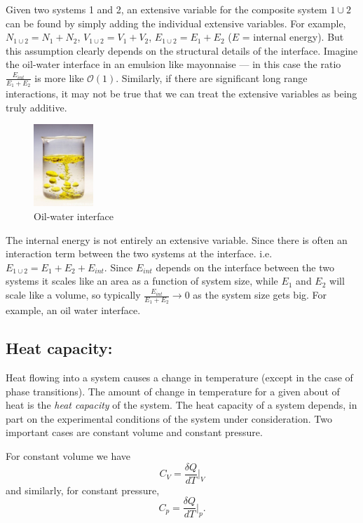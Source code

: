 Given two systems 1 and 2, an extensive variable for the composite system $1\cup2$ can be found by simply adding the individual extensive variables. For example, $N_{1\cup2} = N_1 + N_2$, $V_{1\cup2} = V_1 + V_2$, $E_{1\cup2} = E_1 + E_2$ ($E$ = internal energy). But this assumption clearly depends on the structural details of the interface. Imagine the oil-water interface in an emulsion like mayonnaise --- in this case the ratio  $\frac{E_{int}}{E_1+E_2}$ is more like $\mathcal{O}(1)$.
Similarly, if there are significant long range interactions, it may not be true that we can treat the extensive variables as being truly additive.
\begin{figure}[H]
	\begin{center}
		\includegraphics[width=0.2\textwidth]{oilwater}
	\end{center}
	\caption{Oil-water interface}
\end{figure}
The internal energy is not entirely an extensive variable. Since there is often an interaction term between the two systems at the interface. i.e. $E_{1\cup2} = E_1+E_2+E_{int}$. Since $E_{int}$ depends on the interface between the two systems it scales like an area as a function of system size, while $E_1$ and $E_2$ will scale like a volume, so typically $\frac{E_{int}}{E_1+E_2}\rightarrow0$ as the system size gets big. For example, an oil water interface.

\subsection{Heat capacity:}
Heat flowing into a system causes a change in temperature (except in the case of phase transitions). The amount of change in temperature for a given about of heat is the \emph{heat capacity} of the system. The heat capacity of a system depends, in part on the experimental conditions of the system under consideration. Two important cases are constant volume and constant pressure.

For constant volume we have
$$C_V = \frac{\delta Q}{dT}\bigg\vert_V$$
and similarly, for constant pressure,
$$C_p = \frac{\delta Q}{dT}\bigg\vert_p.$$

